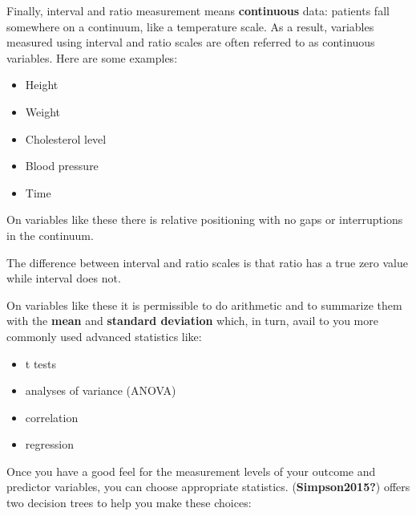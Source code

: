 \documentclass[
  letterpaper,
  DIV=11,
  numbers=noendperiod]{scrreprt}
\providecommand{\tightlist}{%
  \setlength{\itemsep}{0pt}\setlength{\parskip}{0pt}}\usepackage{longtable,booktabs,array}
\begin{document}
Finally, interval and ratio measurement means \textbf{continuous} data:
patients fall somewhere on a continuum, like a temperature scale. As a
result, variables measured using interval and ratio scales are often
referred to as continuous variables. Here are some examples:

\begin{itemize}
\tightlist
\item
  Height
\item
  Weight
\item
  Cholesterol level
\item
  Blood pressure
\item
  Time
\end{itemize}

On variables like these there is relative positioning with no gaps or
interruptions in the continuum.

The difference between interval and ratio scales is that ratio has a
true zero value while interval does not.

On variables like these it is permissible to do arithmetic and to
summarize them with the \textbf{mean} and \textbf{standard deviation}
which, in turn, avail to you more commonly used advanced statistics
like:

\begin{itemize}
\tightlist
\item
  t tests
\item
  analyses of variance (ANOVA)
\item
  correlation
\item
  regression
\end{itemize}

Once you have a good feel for the measurement levels of your outcome and
predictor variables, you can choose appropriate statistics.
(\textbf{Simpson2015?}) offers two decision trees to help you make these
choices:
\end{document}
